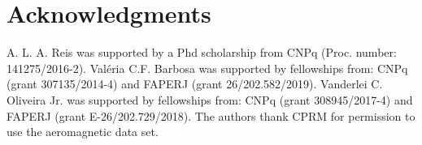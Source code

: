 \section{Acknowledgments}
\label{sec:acknowledgments}

A. L. A. Reis was supported by a Phd scholarship from CNPq (Proc. number: 141275/2016-2). 
Val{\'e}ria C.F. Barbosa was supported by fellowships from: CNPq (grant 307135/2014-4) 
and FAPERJ (grant 26/202.582/2019). Vanderlei C. Oliveira Jr. was supported 
by fellowships from: CNPq (grant 308945/2017-4) and FAPERJ (grant E-26/202.729/2018). 
The authors thank CPRM for permission to use the aeromagnetic data set.


